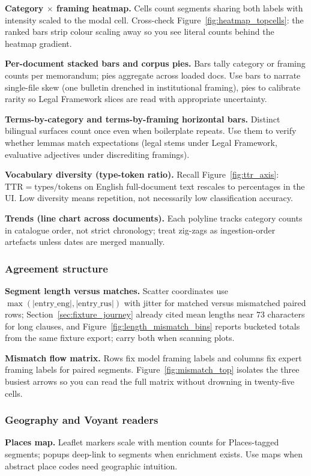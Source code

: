 \documentclass[11pt,a4paper]{article}
\theoremstyle{remark}
\begin{document}
\textbf{Category $\times$ framing heatmap.} Cells count segments sharing both labels with intensity scaled to the modal cell. Cross-check Figure~\ref{fig:heatmap_topcells}: the ranked bars strip colour scaling away so you see literal counts behind the heatmap gradient.

\textbf{Per-document stacked bars and corpus pies.} Bars tally category or framing counts per memorandum; pies aggregate across loaded docs. Use bars to narrate single-file skew (one bulletin drenched in institutional framing), pies to calibrate rarity so Legal Framework slices are read with appropriate uncertainty.

\textbf{Terms-by-category and terms-by-framing horizontal bars.} Distinct bilingual surfaces count once even when boilerplate repeats. Use them to verify whether lemmas match expectations (legal stems under Legal Framework, evaluative adjectives under discrediting framings).

\textbf{Vocabulary diversity (type-token ratio).} Recall Figure~\ref{fig:ttr_axis}: $\mathrm{TTR}=\mathrm{types}/\mathrm{tokens}$ on English full-document text rescales to percentages in the UI. Low diversity means repetition, not necessarily low classification accuracy.

\textbf{Trends (line chart across documents).} Each polyline tracks category counts in catalogue order, not strict chronology; treat zig-zags as ingestion-order artefacts unless dates are merged manually.

\subsubsection{Agreement structure}
\textbf{Segment length versus matches.} Scatter coordinates use $\max(|\mathrm{entry\_eng}|,|\mathrm{entry\_rus}|)$ with jitter for matched versus mismatched paired rows; Section~\ref{sec:fixture_journey} already cited mean lengths near $73$ characters for long clauses, and Figure~\ref{fig:length_mismatch_bins} reports bucketed totals from the same fixture export; carry both when scanning plots.

\textbf{Mismatch flow matrix.} Rows fix model framing labels and columns fix expert framing labels for paired segments. Figure~\ref{fig:mismatch_top} isolates the three busiest arrows so you can read the full matrix without drowning in twenty-five cells.

\subsubsection{Geography and Voyant readers}
\textbf{Places map.} Leaflet markers scale with mention counts for Places-tagged segments; popups deep-link to segments when enrichment exists. Use maps when abstract place codes need geographic intuition.
\end{document}

